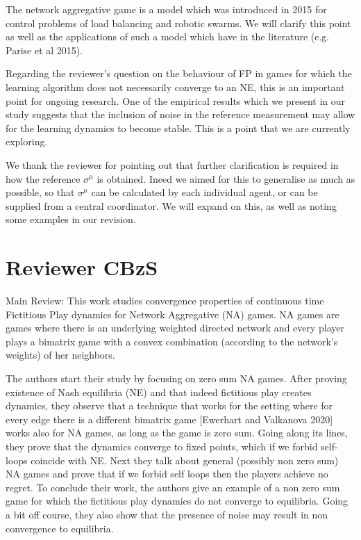 \documentclass{article}
\begin{document}
	The network aggregative game is a model which was introduced in 2015 for control problems of load balancing and robotic swarms. We will clarify this point as well as the applications of such a model which have in the literature (e.g. Parise et al 2015).
	
	Regarding the reviewer's question on the behaviour of FP in games for which the learning algorithm does not necessarily converge to an NE, this is an important point for ongoing research. One of the empirical results which we present in our study suggests that the inclusion of noise in the reference measurement may allow for the learning dynamics to become stable. This is a point that we are currently exploring.
	
	We thank the reviewer for pointing out that further clarification is required in how the reference $\sigma^\mu$ is obtained. Ineed we aimed for this to generalise as much as possible, so that $\sigma^\mu$ can be calculated by each individual agent, or can be supplied from a central coordinator. We will expand on this, as well as noting some examples in our revision.
	
	
	\section{Reviewer CBzS}
	
	
	Main Review:
	This work studies convergence properties of continuous time Fictitious Play dynamics for Network Aggregative (NA) games. NA games are games where there is an underlying weighted directed network and every player plays a bimatrix game with a convex combination (according to the network’s weights) of her neighbors.
	
	The authors start their study by focusing on zero sum NA games. After proving existence of Nash equilibria (NE) and that indeed fictitious play creates dynamics, they observe that a technique that works for the setting where for every edge there is a different bimatrix game [Ewerhart and Valkanova 2020] works also for NA games, as long as the game is zero sum. Going along its lines, they prove that the dynamics converge to fixed points, which if we forbid self-loops coincide with NE. Next they talk about general (possibly non zero sum) NA games and prove that if we forbid self loops then the players achieve no regret. To conclude their work, the authors give an example of a non zero sum game for which the fictitious play dynamics do not converge to equilibria. Going a bit off course, they also show that the presence of noise may result in non convergence to equilibria.
	
\end{document}
